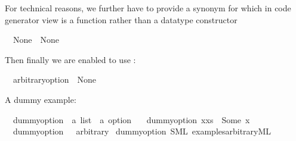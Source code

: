 \begin{isabellebody}
\begin{isamarkuptext}
  For technical reasons, we further have to provide a
  synonym for  which in code generator view
  is a function rather than a datatype constructor%
\end{isamarkuptext}%
\isamarkuptrue%
\isamarkupfalse%
\isanewline
\ \ {\isachardoublequoteopen}None{\isacharprime}\ {\isacharequal}\ None{\isachardoublequoteclose}%
\begin{isamarkuptext}%
Then finally we are enabled to use \isa{{\isasymCODEAXIOMS}}:%
\end{isamarkuptext}%
\isamarkuptrue%
\isamarkupfalse%
\isanewline
\ \ arbitrary{\isacharunderscore}option\ {\isasymequiv}\ None{\isacharprime}%
\begin{isamarkuptext}%
A dummy example:%
\end{isamarkuptext}%
\isamarkuptrue%
\isamarkupfalse%
\isanewline
\ \ dummy{\isacharunderscore}option\ {\isacharcolon}{\isacharcolon}\ {\isachardoublequoteopen}{\isacharprime}a\ list\ {\isasymRightarrow}\ {\isacharprime}a\ option{\isachardoublequoteclose}\ \isanewline
\ \ {\isachardoublequoteopen}dummy{\isacharunderscore}option\ {\isacharparenleft}x{\isacharhash}xs{\isacharparenright}\ {\isacharequal}\ Some\ x{\isachardoublequoteclose}\isanewline
\ \ {\isachardoublequoteopen}dummy{\isacharunderscore}option\ {\isacharbrackleft}{\isacharbrackright}\ {\isacharequal}\ arbitrary{\isachardoublequoteclose}\isanewline
{}\isamarkupfalse%
\ dummy{\isacharunderscore}option\ {\isacharparenleft}SML\ {\isachardoublequoteopen}examples{\isacharslash}arbitrary{\isachardot}ML{\isachardoublequoteclose}{\isacharparenright}%
\begin{isamarkuptext}%


\end{isamarkuptext}
\end{isabellebody}
